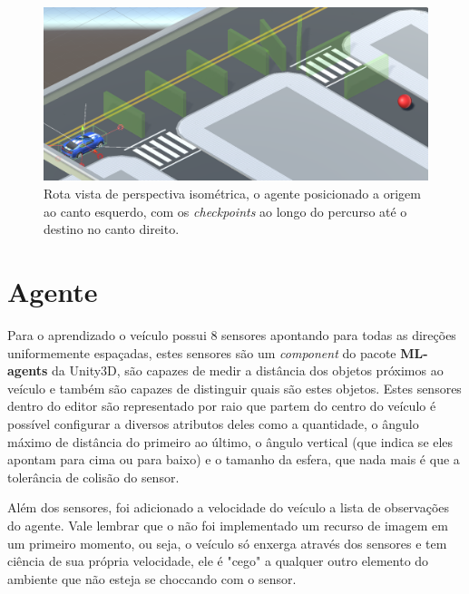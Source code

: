 \begin{figure}[h]
   \centering
   \includegraphics[scale=0.35]{figs/detalhe-rota.png}
    \caption{Rota vista de perspectiva isométrica, o agente posicionado a origem ao canto esquerdo, com os \textit{checkpoints} ao longo do percurso até o destino no canto direito.}
    \label{fig:route-view}
 \end{figure}

 \section{Agente}
 Para o aprendizado o veículo possui 8 sensores apontando para todas as direções uniformemente espaçadas, estes sensores são um \textit{component} do pacote \textbf{ML-agents} da Unity3D, são capazes de medir a distância dos objetos próximos ao veículo e também são capazes de distinguir quais são estes objetos. Estes sensores dentro do editor são representado por raio que partem do centro do veículo é possível configurar a diversos atributos deles como a quantidade, o ângulo máximo de distância do primeiro ao último, o ângulo vertical (que indica se eles apontam para cima ou para baixo) e o tamanho da esfera, que nada mais é que a tolerância de colisão do sensor.

 Além dos sensores, foi adicionado a velocidade do veículo a lista de observações do agente. Vale lembrar que o não foi implementado um recurso de imagem em um primeiro momento, ou seja, o veículo só enxerga através dos sensores e tem ciência de sua própria velocidade, ele é "cego" a qualquer outro elemento do ambiente que não esteja se choccando com o sensor.

